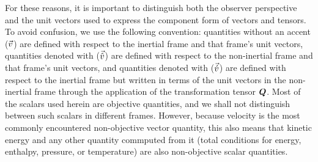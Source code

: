 For these reasons, it is important to distinguish both the observer perspective
and the unit vectors used to express the component form of vectors and tensors.
%
To avoid confusion, we use the following convention:
quantities without an accent ($\vec{{{{v}}}}$) are defined
with respect to the     inertial frame and that frame's unit vectors,
quantities denoted with ($\vec{{{{\hat{v}}}}}$) are defined
with respect to the non-inertial frame and that frame's unit vectors, and
quantities denoted with ($\vec{{{{\acute{v}}}}}$) are defined
with respect to the     inertial frame but written in terms of the
unit vectors in the non-inertial frame
through the application of the transformation tensor ${{\bm{{{{Q}}}}}}$.
%
Most of the scalars used herein are objective quantities,
and we shall not distinguish between such scalars in different frames.
%
However, because velocity is the most commonly encountered
non-objective vector quantity, this also means that
kinetic energy and any other quantity commputed from it
(\forexample total conditions for energy, enthalpy, pressure, or temperature)
are also non-objective scalar quantities.


